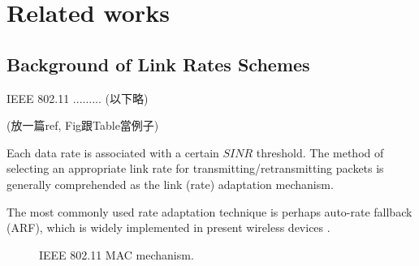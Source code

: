 \chapter{Related works}
\label{cha:related} 

\section{Background of Link Rates Schemes}
\label{sec:intro}

IEEE 802.11 ......... (以下略)

(放一篇ref, Fig跟Table當例子)

Each data rate is associated with a certain $SINR$ threshold. The method of selecting an appropriate link rate for transmitting/retransmitting packets is generally comprehended as the link (rate) adaptation mechanism.

The most commonly used rate adaptation technique is perhaps auto-rate fallback (ARF), which is widely implemented in present wireless devices \cite{Kamerman-bell-97}.

\begin{figure}
\begin{center}
\caption{IEEE 802.11 MAC mechanism.}
\label{fig:DCF}
\vspace{-0.4cm}
\end{center}
\end{figure}



